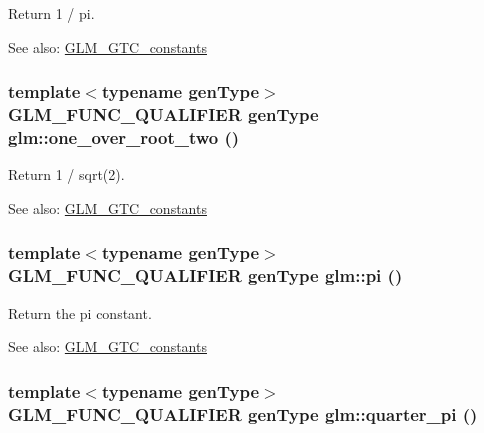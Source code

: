 Return 1 / pi. \begin{Desc}
\item[See also:]\hyperlink{group__gtc__constants}{GLM\_\-GTC\_\-constants} \end{Desc}
\hypertarget{group__gtc__constants_g59e3cc61460e0c503d80df6e70aa38b0}{
\subsubsection[one\_\-over\_\-root\_\-two]{\setlength{\rightskip}{0pt plus 5cm}template$<$typename genType$>$ GLM\_\-FUNC\_\-QUALIFIER genType glm::one\_\-over\_\-root\_\-two ()}}
\label{group__gtc__constants_g59e3cc61460e0c503d80df6e70aa38b0}


Return 1 / sqrt(2). \begin{Desc}
\item[See also:]\hyperlink{group__gtc__constants}{GLM\_\-GTC\_\-constants} \end{Desc}
\hypertarget{group__gtc__constants_g7e73289d56099ea4789c597750dc68b8}{
\subsubsection[pi]{\setlength{\rightskip}{0pt plus 5cm}template$<$typename genType$>$ GLM\_\-FUNC\_\-QUALIFIER genType glm::pi ()}}
\label{group__gtc__constants_g7e73289d56099ea4789c597750dc68b8}


Return the pi constant. \begin{Desc}
\item[See also:]\hyperlink{group__gtc__constants}{GLM\_\-GTC\_\-constants} \end{Desc}
\hypertarget{group__gtc__constants_g42880986550674518989d057ee8b6407}{
\subsubsection[quarter\_\-pi]{\setlength{\rightskip}{0pt plus 5cm}template$<$typename genType$>$ GLM\_\-FUNC\_\-QUALIFIER genType glm::quarter\_\-pi ()}}
\label{group__gtc__constants_g42880986550674518989d057ee8b6407}


